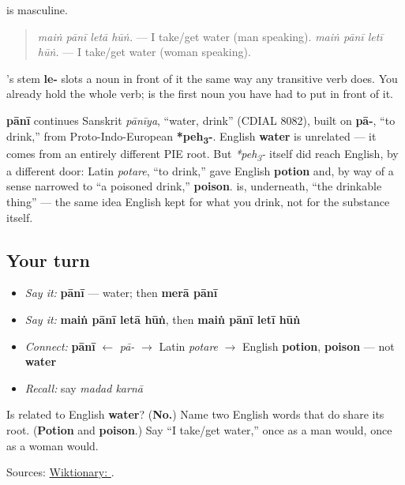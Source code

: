\textbf{} is masculine.

\begin{grammarlens}[title={Grammar Lens: naming what you'd take}]
\begin{quote}
\emph{maiṅ pānī letā hūṅ.} — I take/get water (man speaking). \emph{maiṅ pānī letī hūṅ.} — I take/get water (woman speaking).
\end{quote}

\textbf{}'s stem \textbf{le-} slots a noun in front of it the same way any transitive verb does. You already hold the whole verb; \textbf{} is the first noun you have had to put in front of it.
\end{grammarlens}

\begin{cousinweb}
\textbf{pānī} continues Sanskrit \emph{pānīya}, \textquotedblleft{}water, drink\textquotedblright{} (CDIAL 8082), built on \textbf{pā-}, \textquotedblleft{}to drink,\textquotedblright{} from Proto-Indo-European \textbf{*peh\textsubscript{3}-}. English \textbf{water} is unrelated — it comes from an entirely different PIE root. But \emph{*peh\textsubscript{3}-} itself did reach English, by a different door: Latin \emph{potare}, \textquotedblleft{}to drink,\textquotedblright{} gave English \textbf{potion} and, by way of a sense narrowed to \textquotedblleft{}a poisoned drink,\textquotedblright{} \textbf{poison}. \textbf{} is, underneath, \textquotedblleft{}the drinkable thing\textquotedblright{} — the same idea English kept for what you drink, not for the substance itself.
\end{cousinweb}

\subsection*{Your turn}
\begin{itemize}
\raggedright
  \item \emph{Say it:} \textbf{pānī} — water; then \textbf{merā pānī}
  \item \emph{Say it:} \textbf{maiṅ pānī letā hūṅ}, then \textbf{maiṅ pānī letī hūṅ}
  \item \emph{Connect:} \textbf{pānī} $\leftarrow$ \emph{pā-} $\to$ Latin \emph{potare} $\to$ English \textbf{potion}, \textbf{poison} — not \textbf{water}
  \item \emph{Recall:} say \emph{madad karnā}
\end{itemize}

\begin{tcolorbox}[breakable,colback=teal!4,colframe=teal!35!black,title={Before you move on}]
Is \textbf{} related to English \textbf{water}? (\textbf{No.}) Name two English words that do share its root. (\textbf{Potion} and \textbf{poison}.) Say \textquotedblleft{}I take/get water,\textquotedblright{} once as a man would, once as a woman would.

Sources: \href{https://en.wiktionary.org/wiki/\%D9\%BE\%D8\%A7\%D9\%86\%DB\%8C}{Wiktionary: }.
\end{tcolorbox}
